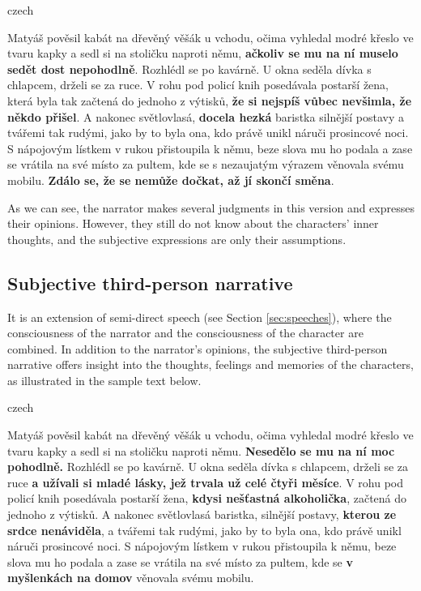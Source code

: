 \begin{otherlanguage*}{czech}
\begin{quoting}
Matyáš pověsil kabát na dřevěný věšák u vchodu, očima vyhledal modré křeslo ve tvaru kapky a sedl si na stoličku naproti němu, \textbf{ačkoliv se mu na ní muselo sedět dost nepohodlně}. Rozhlédl se po kavárně. U okna seděla dívka s chlapcem, drželi se za ruce. V rohu pod policí knih posedávala postarší žena, která byla tak začtená do jednoho z výtisků, \textbf{že si nejspíš vůbec nevšimla, že někdo přišel}. A nakonec světlovlasá, \textbf{docela hezká} baristka silnější postavy a tvářemi tak rudými, jako by to byla ona, kdo právě unikl náruči prosincové noci. S nápojovým lístkem v rukou přistoupila k němu, beze slova mu ho podala a zase se vrátila na své místo za pultem, kde se s nezaujatým výrazem věnovala svému mobilu. \textbf{Zdálo se, že se nemůže dočkat, až jí skončí směna}.
\newline
\end{quoting}
\end{otherlanguage*}

As we can see, the narrator makes several judgments in this version and expresses their opinions. However, they still do not know about the characters' inner thoughts, and the subjective expressions are only their assumptions.

\subsection{Subjective third-person narrative}

It is an extension of semi-direct speech (see Section \ref{sec:speeches}), where the consciousness of the narrator and the consciousness of the character are combined. \cite[p.~393]{muller-sidak-slovnik}
In addition to the narrator's opinions, the subjective third-person narrative offers insight into the thoughts, feelings and memories of the characters, as illustrated in the sample text below.
\newline
\begin{otherlanguage*}{czech}
\begin{quoting}
Matyáš pověsil kabát na dřevěný věšák u vchodu, očima vyhledal modré křeslo ve tvaru kapky a sedl si na stoličku naproti němu. \textbf{Nesedělo se mu na ní moc pohodlně.} Rozhlédl se po kavárně. U okna seděla dívka s chlapcem, drželi se za ruce \textbf{a užívali si mladé lásky, jež trvala už celé čtyři měsíce}. V rohu pod policí knih posedávala postarší žena, \textbf{kdysi nešťastná alkoholička}, začtená do jednoho z výtisků. A nakonec světlovlasá baristka, silnější postavy, \textbf{kterou ze srdce nenáviděla}, a tvářemi tak rudými, jako by to byla ona, kdo právě unikl náruči prosincové noci. S nápojovým lístkem v rukou přistoupila k němu, beze slova mu ho podala a zase se vrátila na své místo za pultem, kde se \textbf{v myšlenkách na domov} věnovala svému mobilu.
\end{quoting}
\end{otherlanguage*}

